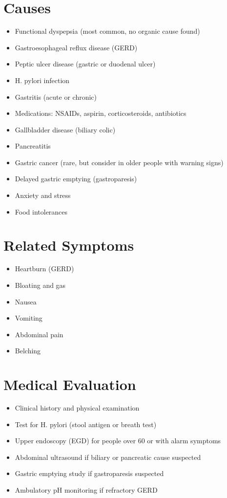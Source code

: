 \section*{Causes}
\begin{itemize}
\item Functional dyspepsia (most common, no organic cause found)
\item Gastroesophageal reflux disease (GERD)
\item Peptic ulcer disease (gastric or duodenal ulcer)
\item H. pylori infection
\item Gastritis (acute or chronic)
\item Medications: NSAIDs, aspirin, corticosteroids, antibiotics
\item Gallbladder disease (biliary colic)
\item Pancreatitis
\item Gastric cancer (rare, but consider in older people with warning signs)
\item Delayed gastric emptying (gastroparesis)
\item Anxiety and stress
\item Food intolerances
\end{itemize}

\section*{Related Symptoms}
\begin{itemize}
\item Heartburn (GERD)
\item Bloating and gas
\item Nausea
\item Vomiting
\item Abdominal pain
\item Belching
\end{itemize}

\section*{Medical Evaluation}
\begin{itemize}
\item Clinical history and physical examination
\item Test for H. pylori (stool antigen or breath test)
\item Upper endoscopy (EGD) for people over 60 or with alarm symptoms
\item Abdominal ultrasound if biliary or pancreatic cause suspected
\item Gastric emptying study if gastroparesis suspected
\item Ambulatory pH monitoring if refractory GERD
\end{itemize}

